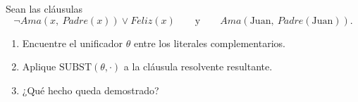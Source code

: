 \begin{exercise}
    Sean las cláusulas
    \[
        \neg Ama(x,\ Padre(x)) \lor Feliz(x) \qquad \text{y} \qquad Ama(\text{Juan},\ Padre(\text{Juan})).
    \]
    \begin{enumerate}
        \item Encuentre el unificador $\theta$ entre los literales complementarios.
        \item Aplique $\text{SUBST}(\theta, \cdot)$ a la cláusula resolvente resultante.
        \item ¿Qué hecho queda demostrado?
    \end{enumerate}
\end{exercise}

